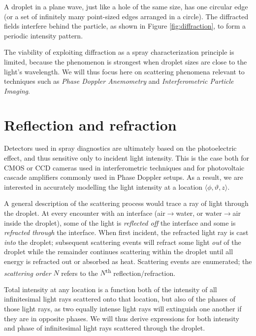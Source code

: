 \documentclass[11.5pt]{book}
\begin{document}

A droplet in a plane wave, just like a hole of the same size, has one circular
edge (or a set of infinitely many point-sized edges arranged in a circle). The
diffracted fields interfere behind the particle, as shown in Figure
\ref{fig:diffraction}, to form a periodic intensity pattern.

The viability of exploiting diffraction as a spray characterization principle is
limited, because the phenomenon is strongest when droplet sizes are close to the
light's wavelength. We will thus focus here on scattering phenomena relevant to
techniques such as \emph{Phase Doppler Anemometry} and \emph{Interferometric
Particle Imaging}.

\section{Reflection and refraction}
Detectors used in spray diagnostics are ultimately based on the photoelectric
effect, and thus sensitive only to incident light intensity. This is the case
both for \textsc{CMOS} or \textsc{CCD} cameras used in interferometric
techniques and for photovoltaic cascade amplifiers commonly used in Phase
Doppler setups. As a result, we are interested in accurately modelling the light
intensity at a location $\langle \phi, \vartheta, z \rangle$.

A general description of the scattering process would trace a ray of light
through the droplet. At every encounter with an interface
(air$\rightarrow$water, or water$\rightarrow$air inside the droplet), some of
the light is \emph{reflected off} the interface and some is \emph{refracted
through} the interface. When first incident, the refracted light ray is cast
\emph{into} the droplet; subsequent scattering events will refract some light
\emph{out} of the droplet while the remainder continues scattering within the
droplet until all energy is refracted out or absorbed as heat. Scattering events
are enumerated; the \emph{scattering order} $N$ refers to the
$N$\textsuperscript{th} reflection/refraction.

Total intensity at any location is a function both of the intensity of all
infinitesimal light rays scattered onto that location, but also of the phases of
those light rays, as two equally intense light rays will extinguish one another
if they are in opposite phases. We will thus derive expressions for both
intensity and phase of infinitesimal light rays scattered through the droplet.
\end{document}
